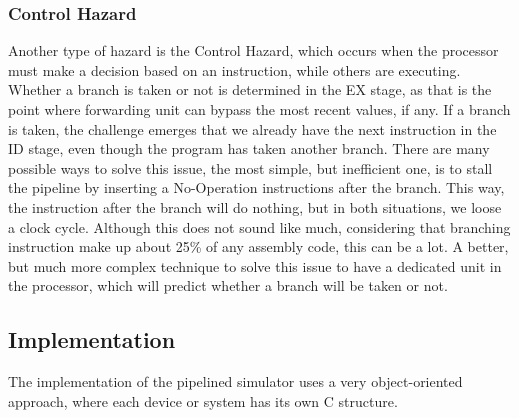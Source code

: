 \subsubsection{Control Hazard}
Another type of hazard is the Control Hazard, which occurs when the processor
must make a decision based on an instruction, while others are executing.
Whether a branch is taken or not is determined in the EX stage, as that is the
point where forwarding unit can bypass the most recent values, if any. If a
branch is taken, the challenge emerges that we already have the next instruction in
the ID stage, even though the program has taken another branch. There are many
possible ways to solve this issue, the most simple, but inefficient one, is to
stall the pipeline by inserting a No-Operation instructions after the branch. This way,
the instruction after the branch will do nothing, but in both situations, we
loose a clock cycle. Although this does not sound like much, considering that
branching instruction make up about 25\% of any assembly
code\cite{instruction_frequency}, this can be a lot.
A better, but much more complex technique to solve this issue to have a
dedicated unit in the processor, which will predict whether a branch will be
taken or not.


\subsection{Implementation}
The implementation of the pipelined simulator uses a very object-oriented
approach, where each device or system has its own C structure.

